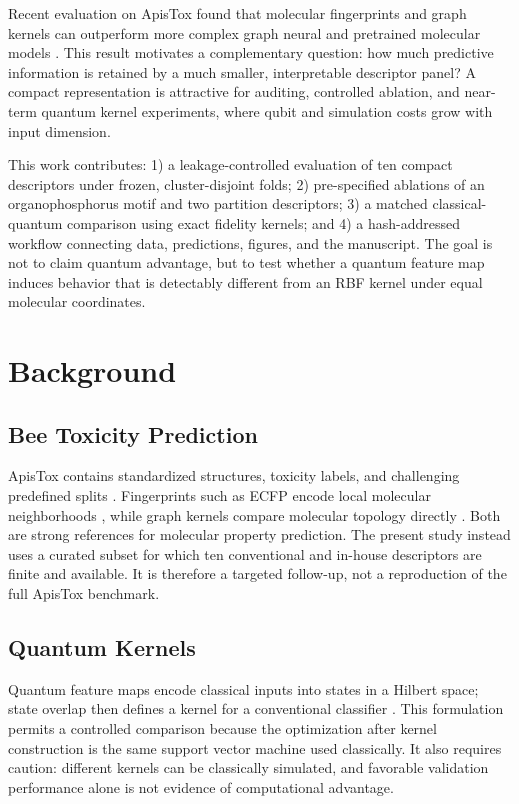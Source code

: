 \documentclass[conference]{IEEEtran}
\begin{document}
Recent evaluation on ApisTox found that molecular fingerprints and graph
kernels can outperform more complex graph neural and pretrained molecular
models \cite{adamczyk2026evaluating}. This result motivates a complementary
question: how much predictive information is retained by a much smaller,
interpretable descriptor panel? A compact representation is attractive for
auditing, controlled ablation, and near-term quantum kernel experiments, where
qubit and simulation costs grow with input dimension.

This work contributes: 1) a leakage-controlled evaluation of ten compact
descriptors under frozen, cluster-disjoint folds; 2) pre-specified ablations of
an organophosphorus motif and two partition descriptors; 3) a matched
classical-quantum comparison using exact fidelity kernels; and 4) a
hash-addressed workflow connecting data, predictions, figures, and the
manuscript. The goal is not to claim quantum advantage, but to test whether a
quantum feature map induces behavior that is detectably different from an RBF
kernel under equal molecular coordinates.

\section{Background}

\subsection{Bee Toxicity Prediction}

ApisTox contains standardized structures, toxicity labels, and challenging
predefined splits \cite{adamczyk2025apistox}. Fingerprints such as ECFP encode
local molecular neighborhoods \cite{rogers2010ecfp}, while graph kernels
compare molecular topology directly \cite{vishwanathan2010graphkernels}.
Both are strong references for molecular property prediction. The present
study instead uses a curated subset for which ten conventional and in-house
descriptors are finite and available. It is therefore a targeted follow-up,
not a reproduction of the full ApisTox benchmark.

\subsection{Quantum Kernels}

Quantum feature maps encode classical inputs into states in a Hilbert space;
state overlap then defines a kernel for a conventional classifier
\cite{havlicek2019supervised,schuld2021kernel}. This formulation permits a
controlled comparison because the optimization after kernel construction is
the same support vector machine used classically. It also requires caution:
different kernels can be classically simulated, and favorable validation
performance alone is not evidence of computational advantage.
\end{document}
